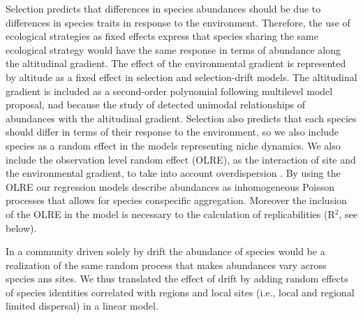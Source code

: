 \documentclass[12pt]{article}
\begin{document}
Selection predicts that differences in species abundances should be
due to differences in species traits in response to the
environment. Therefore, the use of ecological strategies as fixed
effects %
express that species sharing the same ecological strategy would have
the same %
response in terms of abundance along the altitudinal gradient. The
effect of the environmental gradient is represented by altitude as a
fixed effect in selection and selection-drift models. The altitudinal
gradient is included as a second-order polynomial following
\cite{Jamil2013a, Jamil2013} multilevel model proposal, nad because
the study of \cite{Paciencia2008} detected unimodal relationships of
abundances with the altitudinal gradient. Selection also predicts that
each species should differ in terms of their response to the
environment, so we also include species as a random effect in the
models representing niche dynamics. We also include the observation
level random effect (OLRE), as the interaction of site and the
environmental gradient, to take into account overdispersion
\citep{Bolker2009}.  By using the OLRE our regression models describe
abundances as inhomogeneous Poisson processes that allows for species
conspecific aggregation. Moreover the inclusion of the OLRE in the
model is necessary to the calculation of replicabilities (R{$^2$}, see
below).

In a community driven solely by drift the abundance of species would
be a realization of the same random process that makes abundances vary
across species ans sites. We thus translated the effect of drift by adding
random effects of species identities correlated with
regions and local
sites (i.e., local and regional limited dispersal) in a linear
model. %
\end{document}
